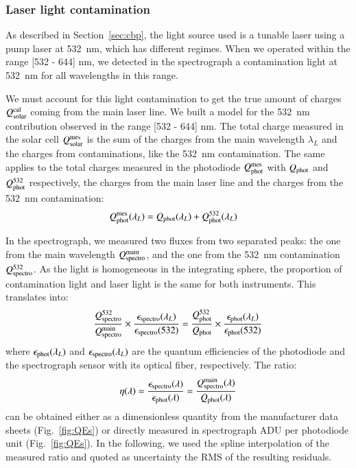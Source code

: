 \subsubsection{Laser light contamination}
\label{sec:532_cont}

As described in Section~\ref{sec:cbp}, the light source used is a tunable laser using a pump laser at \SI{532}{\nano\meter}, which has different regimes. When we operated within the range [532 - 644] nm, we detected in the spectrograph a contamination light at \SI{532}{\nano\meter} for all wavelengths in this range. 

We must account for this light contamination to get the true amount of charges $Q_{\mathrm{solar}}^{\mathrm{cal}}$ coming from the main laser line. We built a model for the \SI{532}{\nano\meter} contribution observed in the range [532 - 644] nm. The total charge measured in the solar cell $Q_{\mathrm{solar}}^{\mathrm{mes}}$ is the sum of the charges from the main wavelength $\lambda_L$ and the charges from contaminations, like the \SI{532}{\nm} contamination. The same applies to the total charges measured in the photodiode $Q_{\mathrm{phot}}^{\mathrm{mes}}$ with $Q_{\mathrm{phot}}$ and $Q_{\mathrm{phot}}^{532}$ respectively, the charges from the main laser line and the charges from the \SI{532}{\nm} contamination:
\begin{align}
Q_{\mathrm{phot}}^{\mathrm{mes}}(\lambda_L) & = Q_{\mathrm{phot}}(\lambda_L) + Q_{\mathrm{phot}}^{532}(\lambda_L) \label{eq:qphot_mes}
\end{align}

In the spectrograph, we measured two fluxes from two separated peaks: the one from the main wavelength $Q_{\mathrm{spectro}}^{\mathrm{main}}$, and the one from the \SI{532}{\nm} contamination $Q_{\mathrm{spectro}}^{532}$. As the light is homogeneous in the integrating sphere, the proportion of contamination light and laser light is the same for both instruments. This translates into:
\begin{equation}
    \frac{Q_{\mathrm{spectro}}^{532}}{Q_{\mathrm{spectro}}^{\mathrm{main}}} \times \frac{\epsilon_{\mathrm{spectro}}(\lambda_L)}{\epsilon_{\mathrm{spectro}}(532)} = \frac{Q_{\mathrm{phot}}^{532}}{Q_{\mathrm{phot}}} \times \frac{\epsilon_{\mathrm{phot}}(\lambda_L)}{\epsilon_{\mathrm{phot}}(532)}
    \label{eq:prev_alpha}
\end{equation}
where $\epsilon_{\mathrm{phot}}(\lambda_L)$ and $\epsilon_{\mathrm{spectro}}(\lambda_L)$ are the quantum efficiencies of the photodiode and the spectrograph sensor with its optical fiber, respectively. The ratio:
\begin{equation}\label{eq:eta}
\eta(\lambda) = \frac{\epsilon_{\mathrm{spectro}}(\lambda)}{\epsilon_{\mathrm{phot}}(\lambda)} = \frac{Q_{\mathrm{spectro}}^{\mathrm{main}}(\lambda)}{Q_{\mathrm{phot}}(\lambda)}
\end{equation}
can be obtained either as a dimensionless quantity from the manufacturer data sheets (Fig.~\ref{fig:QEs}) or directly measured in spectrograph ADU per photodiode unit (Fig.~\ref{fig:QEs}). In the following, we used the spline interpolation of the measured ratio and quoted as uncertainty the RMS of the resulting residuals.

